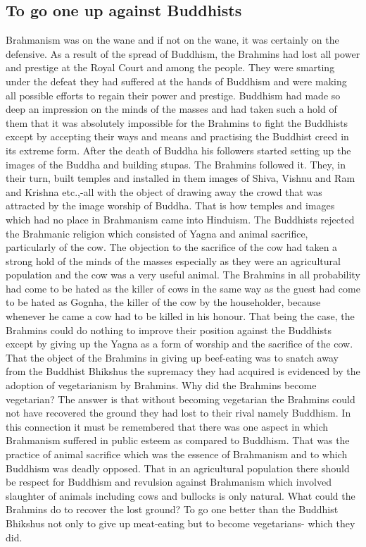 \documentclass{article}
\begin{document}
\subsection{To go one up against Buddhists}
\begin{shadequote}
Brahmanism was on the wane and if not on the wane, it was certainly on the defensive. As a result of the spread of Buddhism, the Brahmins had lost all power and prestige at the Royal Court and among the people. They were smarting under the defeat they had suffered at the hands of Buddhism and were making all possible efforts to regain their power and prestige. Buddhism had made so deep an impression on the minds of the masses and had taken such a hold of them that it was absolutely impossible for the Brahmins to fight the Buddhists except by accepting their ways and means and practising the Buddhist creed in its extreme form. After the death of Buddha his followers started setting up the images of the Buddha and building stupas. The Brahmins followed it. They, in their turn, built temples and installed in them images of Shiva, Vishnu and Ram and Krishna etc.,-all with the object of drawing away the crowd that was attracted by the image worship of Buddha. That is how temples and images which had no place in Brahmanism came into Hinduism. The Buddhists rejected the Brahmanic religion which consisted of Yagna and animal sacrifice, particularly of the cow. The objection to the sacrifice of the cow had taken a strong hold of the minds of the masses especially as they were an agricultural population and the cow was a very useful animal. The Brahmins in all probability had come to be hated as the killer of cows in the same way as the guest had come to be hated as Gognha, the killer of the cow by the householder, because whenever he came a cow had to be killed in his honour. That being the case, the Brahmins could do nothing to improve their position against the Buddhists except by giving up the Yagna as a form of worship and the sacrifice of the cow.
That the object of the Brahmins in giving up beef-eating was to snatch away from the Buddhist Bhikshus the supremacy they had acquired is evidenced by the adoption of vegetarianism by Brahmins. Why did the Brahmins become vegetarian? The answer is that without becoming vegetarian the Brahmins could not have recovered the ground they had lost to their rival namely Buddhism. In this connection it must be remembered that there was one aspect in which Brahmanism suffered in public esteem as compared to Buddhism. That was the practice of animal sacrifice which was the essence of Brahmanism and to which Buddhism was deadly opposed. That in an agricultural population there should be respect for Buddhism and revulsion against Brahmanism which involved slaughter of animals including cows and bullocks is only natural. What could the Brahmins do to recover the lost ground? To go one better than the Buddhist Bhikshus not only to give up meat-eating but to become vegetarians- which they did.
\end{shadequote}
\end{document}
